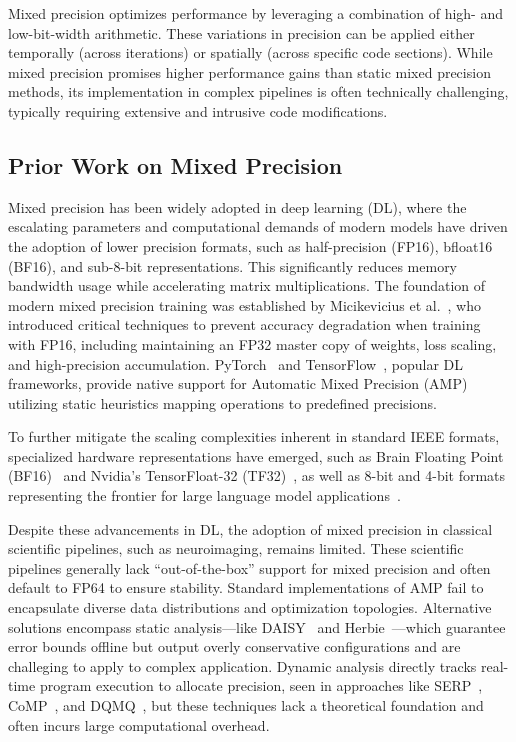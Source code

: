 \documentclass[journal,twoside,web]{ieeecolor}
\begin{document}
Mixed precision optimizes performance by leveraging a combination of high- and low-bit-width arithmetic. These variations in precision can be applied either temporally (across iterations) or spatially (across specific code sections). While mixed precision promises higher performance gains than static mixed precision methods, its implementation in complex pipelines is often technically challenging, typically requiring extensive and intrusive code modifications.

\subsection{Prior Work on Mixed Precision}
Mixed precision has been widely adopted in deep learning (DL), where the escalating parameters and computational demands of modern models have driven the adoption of lower precision formats, such as half-precision (FP16), bfloat16 (BF16), and sub-8-bit representations. This significantly reduces memory bandwidth usage while accelerating matrix multiplications. The foundation of modern mixed precision training was established by Micikevicius et al.~\cite{Micikevicius2017-sf}, who introduced critical techniques to prevent accuracy degradation when training with FP16, including maintaining an FP32 master copy of weights, loss scaling, and high-precision accumulation. PyTorch~\cite{Paszke2019-vk} and TensorFlow~\cite{Abadi2016-vm}, popular DL frameworks, provide native support for Automatic Mixed Precision (AMP) utilizing static heuristics mapping operations to predefined precisions.

To further mitigate the scaling complexities inherent in standard IEEE formats, specialized hardware representations have emerged, such as Brain Floating Point (BF16)~\cite{Kalamkar2019-br} and Nvidia's TensorFloat-32 (TF32)~\cite{Kharya2020-th}, as well as 8-bit and 4-bit formats representing the frontier for large language model applications~\cite{Sevegnani2025-zd}.

Despite these advancements in DL, the adoption of mixed precision in classical scientific pipelines, such as neuroimaging, remains limited. These scientific pipelines generally lack ``out-of-the-box'' support for mixed precision and often default to FP64 to ensure stability. Standard implementations of AMP fail to encapsulate diverse data distributions and optimization topologies. Alternative solutions encompass static analysis---like DAISY~\cite{Darulova2018-wv} and Herbie~\cite{Panchekha2015-au}---which guarantee error bounds offline but output overly conservative configurations and are challeging to apply to complex application. Dynamic analysis directly tracks real-time program execution to allocate precision, seen in approaches like SERP~\cite{Rios2021-it}, CoMP~\cite{Dai2025-ek}, and DQMQ~\cite{Wang2023-iu}, but these techniques lack a theoretical foundation and often incurs large computational overhead. 
\end{document}
